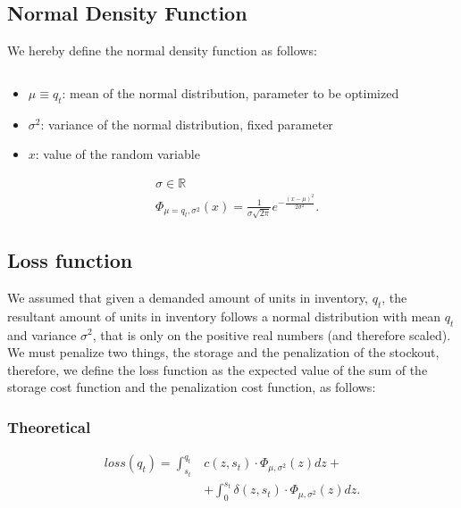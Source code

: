 \documentclass{OptiFlow}
\begin{document}
\subsection{Normal Density Function}
We hereby define the normal density function as follows:

$\text{ }$

\hfill\begin{minipage}{\dimexpr0.5\textwidth-1cm}
\begin{itemize}
	\item $\mu \equiv q_t$: mean of the normal distribution, parameter to be optimized
	\item $\sigma^2$: variance of the normal distribution, fixed parameter
	\item $x$: value of the random variable
\end{itemize}
\end{minipage}

\begin{align*}
	&\sigma \in \mathbb{R}\\
	&\Phi_{\mu=q_t, \sigma^2}\left( x \right)   = \frac{1}{\sigma \sqrt{2\pi} }e^{- \frac{\left( x-\mu \right) ^2}{2 \sigma^2}}
.\end{align*}


\subsection{Loss function}
We assumed that given a demanded amount of units in inventory, $q_t$, the resultant amount of units in inventory
follows a normal distribution with mean $q_t$ and variance $\sigma^2$, that is only on the positive real numbers (and therefore scaled).
We must penalize two things, the storage and the penalization of the stockout, therefore, we define the loss function as 
the expected value of the sum of the storage cost function and the penalization cost function, as follows:

\subsubsection{Theoretical}
\begin{align*}
	loss\left( q_t \right)   = \int_{s_t}^{q_t} &c\left( z,s_t \right) \cdot \Phi_{\mu, \sigma^2}\left( z \right) dz+ \\
										&+ \int_{0}^{s_t} \delta\left( z,s_t \right)\cdot \Phi_{\mu, \sigma^2}\left( z \right) dz  
.\end{align*}
\end{document}
